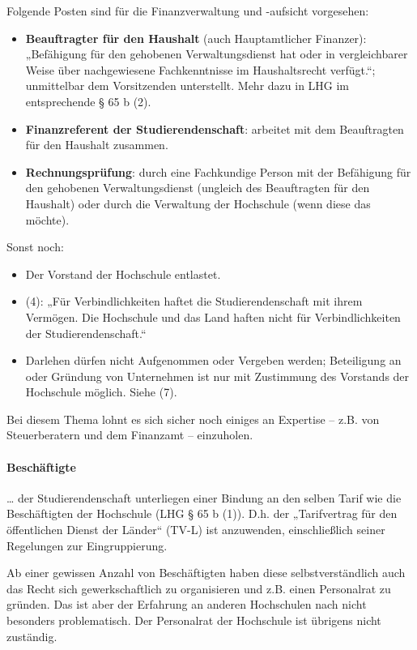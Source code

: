 \documentclass[
10pt,
a4paper,
twoside,								%
titlepage=false,							%
draft=false								%
]{scrartcl}
\begin{document}
Folgende Posten sind für die Finanzverwaltung und -aufsicht vorgesehen:
\begin{itemize}
	\item \textbf{Beauftragter für den Haushalt} (auch Hauptamtlicher Finanzer): „Befähigung für den gehobenen Verwaltungsdienst hat oder in vergleichbarer Weise über nachgewiesene Fachkenntnisse im Haushaltsrecht verfügt.“; unmittelbar dem Vorsitzenden unterstellt. Mehr dazu in LHG im entsprechende § 65 b (2).
	\item \textbf{Finanzreferent der Studierendenschaft}: arbeitet mit dem Beauftragten für den Haushalt zusammen. 
	\item \textbf{Rechnungsprüfung}: durch eine Fachkundige Person mit der Befähigung für den gehobenen Verwaltungsdienst (ungleich des Beauftragten für den Haushalt) oder durch die Verwaltung der Hochschule (wenn diese das möchte).
\end{itemize}

Sonst noch:
\begin{itemize}
	\item Der Vorstand der Hochschule entlastet.
	\item (4): „Für Verbindlichkeiten haftet die Studierendenschaft mit ihrem Vermögen. Die Hochschule und das Land haften nicht für Verbindlichkeiten der Studierendenschaft.“
	\item Darlehen dürfen nicht Aufgenommen oder Vergeben werden; Beteiligung an oder Gründung von Unternehmen ist nur mit Zustimmung des Vorstands der Hochschule möglich. Siehe (7).
\end{itemize}

Bei diesem Thema lohnt es sich sicher noch einiges an Expertise – z.B. von Steuerberatern und dem Finanzamt – einzuholen.


\paragraph{Beschäftigte}

… der Studierendenschaft unterliegen einer Bindung an den selben Tarif wie die Beschäftigten der Hochschule (LHG § 65 b (1)). D.h. der „Tarifvertrag für den öffentlichen Dienst der Länder“ (TV-L) ist anzuwenden, einschließlich seiner Regelungen zur Eingruppierung.

Ab einer gewissen Anzahl von Beschäftigten haben diese selbstverständlich auch das Recht sich gewerkschaftlich zu organisieren und z.B. einen Personalrat zu gründen. Das ist aber der Erfahrung an anderen Hochschulen nach nicht besonders problematisch. Der Personalrat der Hochschule ist übrigens nicht zuständig.
\end{document}
